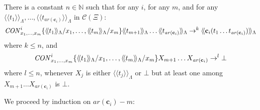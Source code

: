 \documentclass{LMCS}
\newcommand{\conone}{\mathbf{c}}
\newcommand{\varone}{x}
\newcommand{\termone}{t}
\newcommand{\cltermone}{X}
\newcommand{\TRSonetolambdaI}[1]{\langle\!\langle #1\rangle\!\rangle_{\Lambdaterms}}
\newcommand{\errorterm}{\bot}
\newcommand{\arity}[1]{\mathit{ar}(#1)}
\newcommand{\Lambdaterms}{\Lambda}
\newcommand{\TRSone}{\Xi}
\newcommand{\TRScontermsp}[1]{\mathcal{C}(#1)}
\newcommand{\rewrTRS}{\rightarrow}
\newcommand{\N}{\mathbb{N}}
\begin{document}
\begin{lem}\label{Lemma-TRSonetolambdaII}
There is a constant $n\in\N$ such that for any $i$, for any $m$, and for any
$\TRSonetolambdaI{\termone_1},\ldots,\TRSonetolambdaI{\termone_{\arity{\conone_i}}}$ in $\TRScontermsp{\TRSone}$:
$$
\conslambda^i_{\varone_1,\ldots,\varone_m}\{\TRSonetolambdaI{\termone_1}/\varone_1,\ldots,\TRSonetolambdaI{\termone_m}/\varone_m\}
\TRSonetolambdaI{\termone_{m+1}}\ldots\TRSonetolambdaI{\termone_{\arity{\conone_i}}}
\rewrTRS^k\TRSonetolambdaI{\conone_i(\termone_1\ldots\termone_{\arity{\conone_i}})}
$$
where $k\leq n$, and
$$
\conslambda^i_{\varone_1,\ldots,\varone_m}\{\TRSonetolambdaI{\termone_1}/\varone_1,\ldots,\TRSonetolambdaI{\termone_m}/\varone_m\}
\cltermone_{m+1}\ldots\cltermone_{\arity{\conone_i}}
\rewrTRS^l\errorterm
$$
where $l\leq n$, whenever $\cltermone_{j}$ is either $\TRSonetolambdaI{\termone_j}$ or $\errorterm$
but at least one among $\cltermone_{m+1}\ldots\cltermone_{\arity{\conone_i}}$ is $\errorterm$.
\end{lem}
\proof
We proceed by induction on $\arity{\conone_i}-m$:
\end{document}
